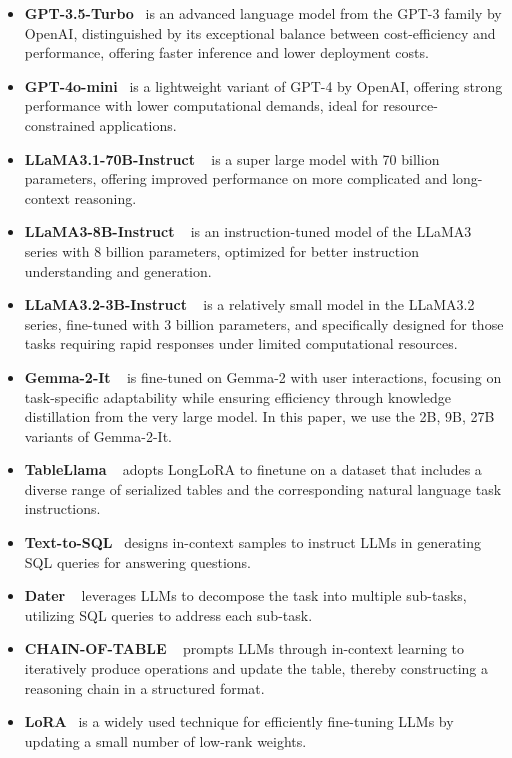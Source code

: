 {\begin{itemize}[leftmargin=*]
    \item \textbf{GPT-3.5-Turbo}~\cite{openai2023gpt35turbo} is an advanced language model from the GPT-3 family by OpenAI, distinguished by its exceptional balance between cost-efficiency and performance, offering faster inference and lower deployment costs.
    \item \textbf{GPT-4o-mini}~\cite{gpt4ominiurl} is a lightweight variant of GPT-4 by OpenAI, offering strong performance with lower computational demands, ideal for resource-constrained applications.
    \item \textbf{LLaMA3.1-70B-Instruct} ~\cite{touvron2024llama3} is a super large model with 70 billion parameters, offering improved performance on more complicated and long-context reasoning.
    \item \textbf{LLaMA3-8B-Instruct} ~\cite{touvron2024llama3} is an instruction-tuned model of the LLaMA3 series with 8 billion parameters, optimized for better instruction understanding and generation. 
    \item \textbf{LLaMA3.2-3B-Instruct} ~\cite{touvron2024llama3} is a relatively small model in the LLaMA3.2 series, fine-tuned with 3 billion parameters, and specifically designed for those tasks requiring rapid responses under limited computational resources.
    \item \textbf{Gemma-2-It} ~\cite{gemma} is fine-tuned on Gemma-2 with user interactions, focusing on task-specific adaptability while ensuring efficiency through knowledge distillation from the very large model. In this paper, we use the 2B, 9B, 27B variants of Gemma-2-It.
    \item \textbf{TableLlama} ~\cite{zhang2024tablellama} adopts LongLoRA to finetune on a dataset that includes a diverse range of serialized tables and the corresponding natural language task instructions.
    \item \textbf{Text-to-SQL}~\cite{rajkumar2022evaluating} designs in-context samples to instruct LLMs in generating SQL queries for answering questions. 
    \item \textbf{Dater} ~\cite{dater} leverages LLMs to decompose the task into multiple sub-tasks, utilizing SQL queries to address each sub-task.
    \item \textbf{CHAIN-OF-TABLE} ~\cite{wang2024chainoftable} prompts LLMs through in-context learning to iteratively produce operations and update the table, thereby constructing a reasoning chain in a structured format.
    \item \textbf{LoRA}~\cite{hu2022lora} is a widely used technique for efficiently fine-tuning LLMs by updating a small number of low-rank weights.  
\end{itemize}

}
